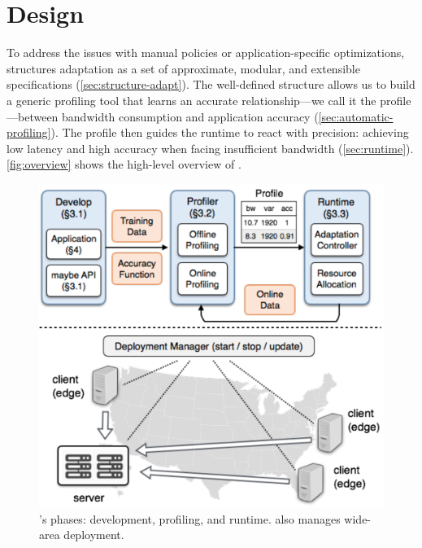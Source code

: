\section{\sysname{} Design}
\label{sec:system}

To address the issues with manual policies or application-specific
optimizations, \sysname{} structures adaptation as a set of approximate,
modular, and extensible specifications (\autoref{sec:structure-adapt}). The
well-defined structure allows us to build a generic profiling tool that learns
an accurate relationship---we call it the profile---between bandwidth
consumption and application accuracy (\autoref{sec:automatic-profiling}). The
profile then guides the runtime to react with precision: achieving low latency
and high accuracy when facing insufficient bandwidth
(\autoref{sec:runtime}). \autoref{fig:overview} shows the high-level overview of
\sysname{}.

\begin{figure}
  \centering
  \includegraphics[width=0.9\linewidth]{figures/system.pdf}
  \caption{\sysname{}'s phases: development, profiling, and runtime. \sysname{}
    also manages wide-area deployment.}
  \label{fig:overview}
\end{figure}






